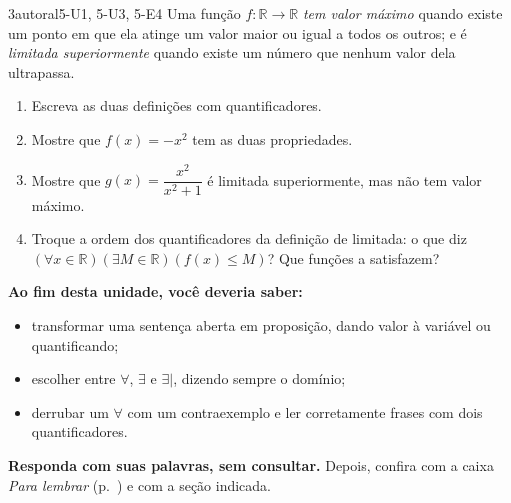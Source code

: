 \begin{questao}{3}{autoral}{5-U1, 5-U3, 5-E4}\label{u5:q12}
Uma função $f:\mathbb{R}\to\mathbb{R}$ \emph{tem valor máximo} quando existe um ponto em que ela atinge um valor maior ou igual a todos os outros; e é \emph{limitada superiormente} quando existe um número que nenhum valor dela ultrapassa.
\begin{enumerate}[label=\alph*)]
  \item Escreva as duas definições com quantificadores.
  \item Mostre que $f(x)=-x^2$ tem as duas propriedades.
  \item Mostre que $g(x)=\dfrac{x^2}{x^2+1}$ é limitada superiormente, mas não tem valor máximo.
  \item Troque a ordem dos quantificadores da definição de limitada: o que diz $(\forall x\in\mathbb{R})(\exists M\in\mathbb{R})(f(x)\le M)$? Que funções a satisfazem?
\end{enumerate}
\end{questao}

\begin{sintese}
\textbf{Ao fim desta unidade, você deveria saber:}
\begin{itemize}[leftmargin=1.4em,itemsep=1pt]
  \item transformar uma sentença aberta em proposição, dando valor à variável ou quantificando;
  \item escolher entre $\forall$, $\exists$ e $\exists|$, dizendo sempre o domínio;
  \item derrubar um $\forall$ com um contraexemplo e ler corretamente frases com dois quantificadores.
\end{itemize}
\smallskip\noindent\textbf{Responda com suas palavras, sem consultar.} Depois, confira com a caixa \emph{Para lembrar} (p.~\pageref{lembrar-u5}) e com a seção indicada.
\begin{enumerate}[label=\arabic*.,leftmargin=1.4em]
\end{enumerate}
\end{sintese}

\Respostas
{\small
{}
}
